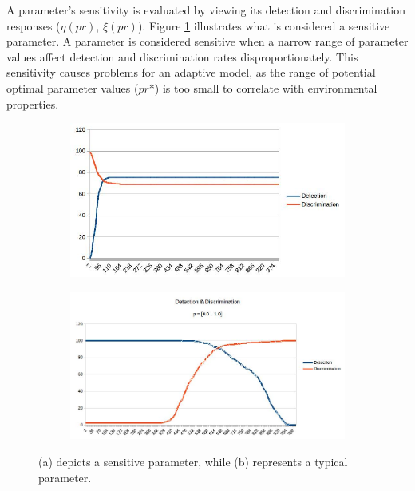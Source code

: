 A parameter's sensitivity is evaluated by viewing its detection and discrimination responses ($\eta(pr)$, $\xi(pr)$). Figure \ref{fig:paramsensitivity} illustrates what is considered a sensitive parameter. A parameter is considered sensitive when a narrow range of parameter values affect detection and discrimination rates disproportionately. This sensitivity causes problems for an adaptive model, as the range of potential optimal parameter values ($pr$*) is too small to correlate with environmental properties. 

\begin{figure}
\centering
\begin{subfigure}{.49\linewidth}
  \includegraphics[width=1\linewidth]{figures/sensitive_param.jpg}
  \caption{}
\end{subfigure}
\hfill
\begin{subfigure}{.49\linewidth}
  \includegraphics[width=1\linewidth]{figures/campus_dd.jpg}
  \caption{}
\end{subfigure}

\caption{(a) depicts a sensitive parameter, while (b) represents a typical parameter.}
\label{fig:paramsensitivity}
\end{figure}

